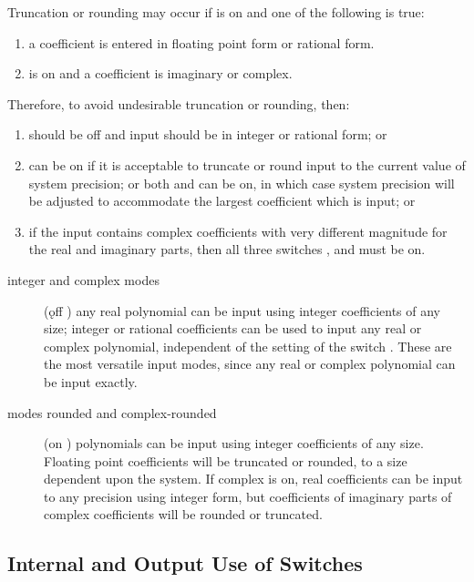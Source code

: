 Truncation or rounding may occur if  is on and
one of the following is true:

\begin{enumerate}
\item a coefficient is entered in floating point form or rational form.
\item {} is on and a coefficient is imaginary or complex.
\end{enumerate}

Therefore, to avoid undesirable truncation or rounding, then:

\begin{enumerate}
\item {} should be off and input should be
in integer or rational form; or
\item {} can be on if it is acceptable to truncate or round
input to the current value of system precision; or both  and
 can be on, in which case system precision will be adjusted
to accommodate the largest coefficient which is input; or
\item if the
input contains complex coefficients with very different magnitude for the
real and imaginary parts, then all three switches ,  and
 must be on.
\end{enumerate}

\begin{description}
\item[integer and complex modes] (\k{off} ) any real
polynomial can be input using integer coefficients of any size; integer or
rational coefficients can be used to input any real or complex polynomial,
independent of the setting of the switch .  These are the most
versatile input modes, since any real or complex polynomial can be input
exactly.

\item[modes rounded and complex-rounded] (on ) polynomials can be
input using
integer coefficients of any size.  Floating point coefficients will be
truncated or rounded, to a size dependent upon the system.  If complex
is on, real coefficients can be input to any precision using integer
form, but coefficients of imaginary parts of complex coefficients will
be rounded or truncated.
\end{description}

\subsection{Internal and Output Use of Switches}

